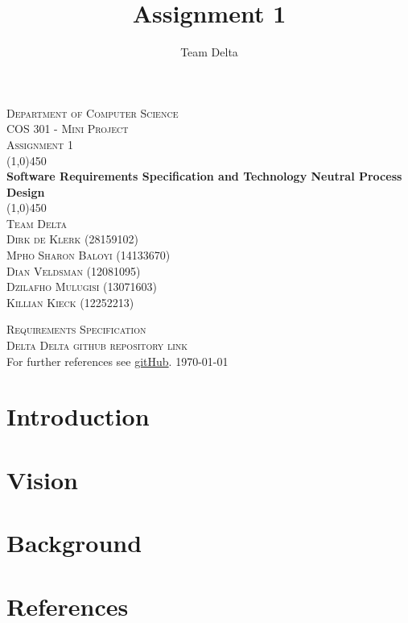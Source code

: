 \documentclass[a4paper,12pt]{report}
\author{Team Delta}
\title{ Assignment 1}
\begin{document}
\setlength{\parskip}{6pt}

	\begin{titlepage}
		\begin{center}
			\textsc{\LARGE Department of Computer Science} \\ [.5cm]
			\textsc{\Large COS 301 - Mini Project} \\ [.5cm]
			\textsc{\Large Assignment 1} \\ [.5cm]
			\line(1,0){450}\\[.5cm]
			\huge{\bfseries Software Requirements Specification and Technology Neutral Process Design}\\
			\line(1,0){450}\\[1cm]
			\textsc{\LARGE Team Delta}\\ [1cm]
			
			\textsc{\Large Dirk de Klerk (28159102)}\\
			\textsc{\Large Mpho Sharon Baloyi (14133670)}\\
			\textsc{\Large Dian Veldsman (12081095)}\\
			\textsc{\Large Dzilafho Mulugisi (13071603)}\\
			\textsc{\Large Killian Kieck (12252213)}\\
			
		\end{center}
	\end{titlepage}
\footnotesize
\normalsize

\renewcommand{\thesection}{\arabic{section}}
\newpage
\begin{center}
\textsc{\LARGE Requirements Specification}\\[1.5cm]
\textsc{\Large Delta Delta github repository link}\\[0.5cm]
For further references see \href{https://github.com/u12081095/COS301-Team-Delta}{gitHub}.
\today
\end{center}


\newpage
\section{Introduction}

\newpage
\section{Vision}

\newpage
\section{Background}


\newpage
\section{References}
\end{document}
